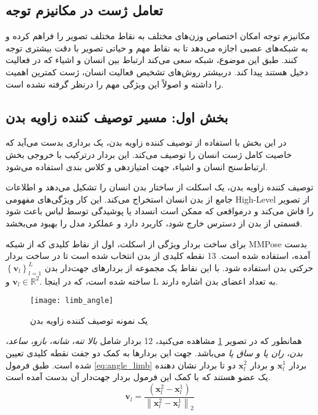  \subsection{تعامل ژست در مکانیزم توجه}

مکانیزم توجه امکان اختصاص وزن‌های مختلف به نقاط مختلف تصویر را فراهم کرده و به شبکه‌های عصبی اجازه می‌دهد تا به نقاط مهم و حیاتی تصویر با دقت بیشتری توجه کنند. طبق این موضوع، شبکه سعی می‌‌کند ارتباط بین انسان و اشیاء که در فعالیت دخیل هستند پیدا کند. دربیشتر روش‌های تشخیص فعالیت انسان، ژست کمترین اهمیت را داشته و اصولاً این ویژگی مهم را درنظر گرفته نشده است. 
 
 \subsection{بخش اول: مسیر توصیف کننده زاویه بدن }
 
 در این بخش با استفاده از توصیف کننده زاویه بدن،‌ یک برداری بدست می‌آید که خاصیت کامل ژست انسان را توصیف می‌کند. این بردار درترکیب با خروجی بخش ارتباط‌سنج انسان و اشیاء، جهت امتیاز‌دهی و کلاس بندی استفاده می‌شود.
 
 توصیف کننده زاویه بدن، یک اسکلت از ساختار بدن انسان را تشکیل می‌دهد و اطلاعات جامع از بدن انسان استخراج می‌کند. این کار ویژگی‌های مفهومی %
\gls{High-Level}
  از تصویر را فاش ‌می‌کند و درمواقعی که ممکن است انسداد یا پوشیدگی توسط لباس باعث شود قسمتی از بدن از دسترس خارج شود، کاربرد دارد و عملکرد مدل را بهبود می‌بخشد. 
  
برای ساخت بردار ویژگی از اسکلت، اول از نقاط کلیدی که از شبکه MMPose بدست آمده، استفاده شده است. 13 نقطه کلیدی از بدن انتخاب شده است تا در ساخت بردار حرکتی بدن استفاده شود. با این نقاط یک مجموعه از بردارهای جهت‌دار بدن 
 $\left\{\mathbf{v}_l\right\}_{l=1}^L$
 ساخته شده است،‌ که در اینجا 
 .$\mathbf{v}_l \in \mathbb{R}^2$
 و L به تعداد اعضای بدن اشاره دارند.
 
 \begin{figure}[ht]
 	\centerline{\texttt{[image: limb\_angle]}}
 	\caption{یک نمونه توصیف کننده زاویه بدن}
 	\label{fig:limb_angle}
 \end{figure}

 همانطور که در تصویر %
 \ref{fig:limb_angle}
 مشاهده می‌کنید،‌ 12 بردار شامل 
 \textit{بالا تنه، }
 \textit{شانه، }
\textit{بازو، }
\textit{ساعد، }
\textit{بدن، }
\textit{ران پا و }
\textit{ساق پا}
می‌باشد. جهت این بردارها به کمک دو جفت نقطه کلیدی تعیین شده است.
 طبق فرمول %
 \ref{eq:angle_limb}
 بردار %
 $\mathbf{x}_l^1$
  و بردار %
   $\mathbf{x}_l^2$
 دو تا بردار نشان دهنده یک عضو هستند که با کمک این فرمول بردار جهت‌دار آن بدست آمده است.
\begin{equation}
	\label{eq:angle_limb}
	\mathbf{v}_l=\frac{\left(\mathbf{x}_l^2-\mathbf{x}_l^1\right)}{\left\|\mathbf{x}_l^2-\mathbf{x}_l^1\right\|_2}
\end{equation}

